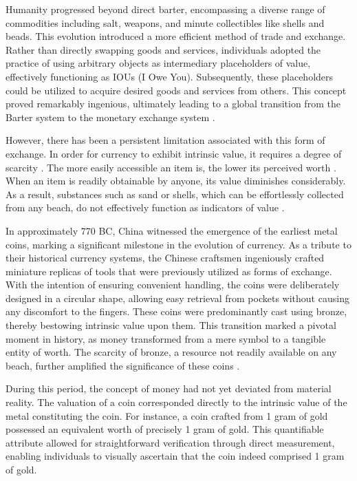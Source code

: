 Humanity progressed beyond direct barter, encompassing a diverse range of commodities including salt, weapons, and minute collectibles like shells and beads.
This evolution introduced a more efficient method of trade and exchange. Rather than directly swapping goods and services, individuals adopted the practice
of using arbitrary objects as intermediary placeholders of value, effectively functioning as IOUs (I Owe You). Subsequently, these placeholders could be
utilized to acquire desired goods and services from others. This concept proved remarkably ingenious, ultimately leading to a global transition from the
Barter system to the monetary exchange system \cite{graeber2012debt}.

However, there has been a persistent limitation associated with this form of exchange. In order for currency to exhibit intrinsic value, it requires a degree
of scarcity \cite{smith2010wealth, ricardo1821principles}. The more easily accessible an item is, the lower its perceived worth \cite{marshall2009principles}.
When an item is readily obtainable by anyone, its value diminishes considerably. As a result, substances such as sand or shells, which can be effortlessly
collected from any beach, do not effectively function as indicators of value \cite{principlesmenger, hicks1936keynes}.

In approximately 770 BC, China witnessed the emergence of the earliest metal coins, marking a significant milestone in the evolution of currency. As a
tribute to their historical currency systems, the Chinese craftsmen ingeniously crafted miniature replicas of tools that were previously utilized as
forms of exchange. With the intention of ensuring convenient handling, the coins were deliberately designed in a circular shape, allowing easy retrieval
from pockets without causing any discomfort to the fingers. These coins were predominantly cast using bronze, thereby bestowing intrinsic value upon them.
This transition marked a pivotal moment in history, as money transformed from a mere symbol to a tangible entity of worth. The scarcity of bronze, a
resource not readily available on any beach, further amplified the significance of these coins \cite{li2003, hartill2005}.

During this period, the concept of money had not yet deviated from material reality. The valuation of a coin corresponded directly to the intrinsic value
of the metal constituting the coin. For instance, a coin crafted from 1 gram of gold possessed an equivalent worth of precisely 1 gram of gold. This
quantifiable attribute allowed for straightforward verification through direct measurement, enabling individuals to visually ascertain that the coin
indeed comprised 1 gram of gold.

